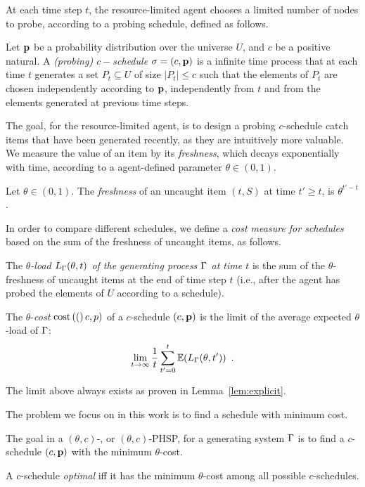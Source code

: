 At each time step $t$, the resource-limited agent chooses a limited number
of nodes to probe, according to a probing schedule, defined as follows.

\begin{definition}[$c$-Schedule]
Let $\mathbf{p}$ be a probability distribution over the universe $U$, and $c$ be a
positive natural. A \emph{(probing) $c-$schedule} $\sigma=(c,\mathbf{p})$ is a infinite
time process that at each time $t$ generates a set $P_t\subseteq U$ of size
$|P_t|\le c$ such that the elements of $P_t$ are chosen independently according
to $\mathbf{p}$, independently from $t$ and from the elements generated at previous time
steps.
\end{definition}

The goal, for the resource-limited agent, is to design a probing $c$-schedule
catch items that have been generated recently, as they are intuitively more
valuable. We measure the value of an item by its \emph{freshness}, which decays
exponentially with time, according to a agent-defined parameter
$\theta\in(0,1)$. 

\begin{definition}
	Let $\theta\in(0,1)$. The \emph{freshness} of an uncaught item $(t,S)$ at
	time $t'\ge t$, is $\theta^{t'-t}$. 
\end{definition}

In order to compare different schedules, we define a \emph{cost measure for
schedules} based on the sum of the freshness of uncaught items, as follows.

The \emph{$\theta$-load $L_\Gamma(\theta, t)$ of the generating process $\Gamma$ at
time $t$} is the sum of the $\theta$-freshness of uncaught items at the end of
time step $t$ (i.e., after the agent has probed the elements of $U$ according to
a schedule). 

\begin{definition}
	The $\theta$-\emph{cost} $\text{cost}\left( ( \right)c,p)$ of a $c$-schedule $(c,\mathbf{p})$ is the
	limit of the average expected $\theta$-load of $\Gamma$:
	\[
	\lim\limits_{t\rightarrow\infty}\frac{1}{t}\sum_{t'=0}^{t}\mathbb{E}(L_\Gamma(\theta,t'))\enspace.
	\]
\end{definition}
The limit above always exists as proven in Lemma~\ref{lem:explicit}.

The problem we focus on in this work is to find a schedule with minimum cost.

\begin{definition}[\probname]
 The goal in a $(\theta,c)$-{\probname}, or $(\theta,c)$-PHSP, for a generating
 system $\Gamma$ is to find  a $c$-schedule $(c,\mathbf{p})$ with the minimum
 $\theta$-cost. 
 
 A $c$-schedule \emph{optimal} iff it has the minimum $\theta$-cost among all
 possible $c$-schedules.
\end{definition}

